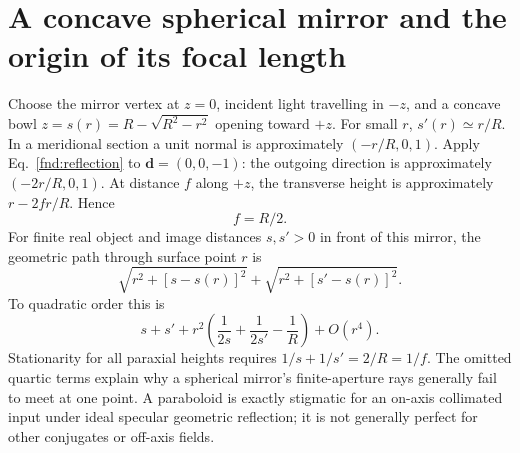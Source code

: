\section{A concave spherical mirror and the origin of its focal length}
Choose the mirror vertex at $z=0$, incident light travelling in $-z$, and a concave bowl $z=s(r)=R-\sqrt{R^2-r^2}$ opening toward $+z$. For small $r$, $s'(r)\simeq r/R$. In a meridional section a unit normal is approximately $(-r/R,0,1)$. Apply Eq.~\eqref{fnd:reflection} to $\bm{d}=(0,0,-1)$: the outgoing direction is approximately $(-2r/R,0,1)$. At distance $f$ along $+z$, the transverse height is approximately $r-2fr/R$. Hence
\begin{equation}
\boxed{f=R/2.}
\label{fnd:mirrorf}
\end{equation}
For finite real object and image distances $s,s'>0$ in front of this mirror, the geometric path through surface point $r$ is
\[
\sqrt{r^2+[s-s(r)]^2}+\sqrt{r^2+[s'-s(r)]^2}.
\]
To quadratic order this is
\[
s+s'+r^2\left(\frac{1}{2s}+\frac{1}{2s'}-\frac1R\right)+O(r^4).
\]
Stationarity for all paraxial heights requires $1/s+1/s'=2/R=1/f$. The omitted quartic terms explain why a spherical mirror's finite-aperture rays generally fail to meet at one point. A paraboloid is exactly stigmatic for an on-axis collimated input under ideal specular geometric reflection; it is not generally perfect for other conjugates or off-axis fields.

